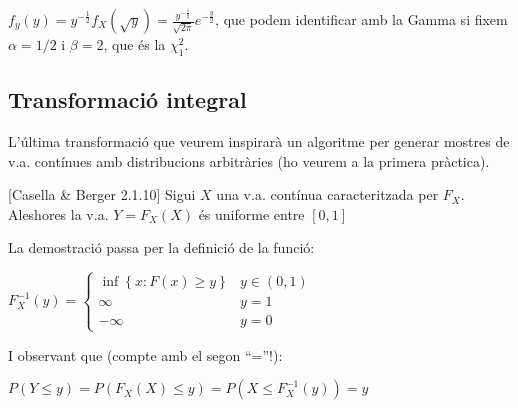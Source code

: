 \documentclass[letterpaper,10pt,english]{sphinxmanual}
\begin{document}
\(f_y\left(y\right) = y^{-\frac{1}{2}} f_X\left(\sqrt{y}\right) = \frac{y^{-\frac{1}{2}}}{\sqrt{2\pi}} e^{-\frac{y}{2}}\),
que podem identificar amb la Gamma si fixem \(\alpha=1/2\) i \(\beta=2\), que és
la \(\chi^2_1\).


\subsection{Transformació integral}
\label{\detokenize{0_Intro/0_1_Repas_probabilitat:transformacio-integral}}
L’última transformació que veurem inspirarà un
algoritme per generar mostres de v.a. contínues amb distribucions
arbitràries (ho veurem a la primera pràctica).

{[}Casella \& Berger 2.1.10{]} Sigui \(X\) una v.a. contínua caracteritzada per \(F_X\). Aleshores
la v.a. \(Y = F_X\left(X\right)\) és uniforme entre \(\left[0, 1\right]\)

La demostració passa per la definició de la funció:

\(F_X^{-1}\left(y\right) = \left\{\begin{array}{cc} \inf \left\{x : F\left(x\right) \geq y \right\} & y \in \left(0, 1\right) \\ \infty & y=1 \\ -\infty & y = 0 \end{array}\right.\)

I observant que (compte amb el segon “=”!):

\(P\left(Y \leq y \right) = P\left(F_X\left(X\right) \leq y\right) = P\left(X \leq F_X^{-1}\left(y\right)\right) = y\)
\end{document}
